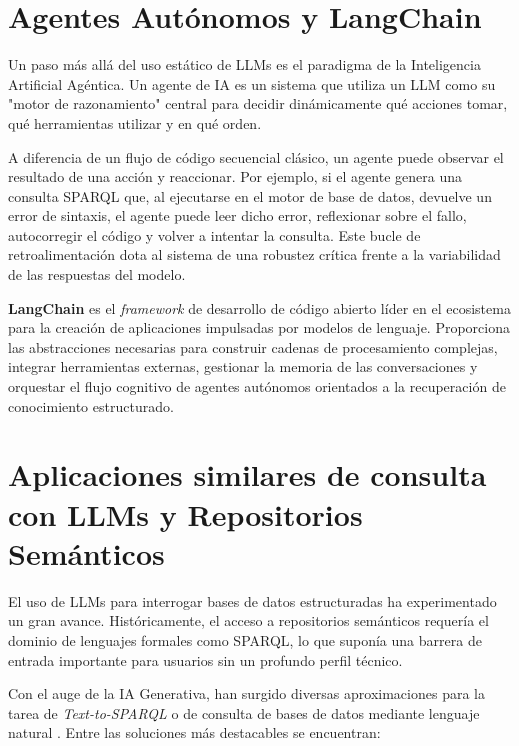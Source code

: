 \section{Agentes Autónomos y LangChain}

Un paso más allá del uso estático de LLMs es el paradigma de la Inteligencia Artificial Agéntica. Un agente de IA es un sistema que utiliza un LLM como su "motor de razonamiento" central para decidir dinámicamente qué acciones tomar, qué herramientas utilizar y en qué orden.

A diferencia de un flujo de código secuencial clásico, un agente puede observar el resultado de una acción y reaccionar. Por ejemplo, si el agente genera una consulta SPARQL que, al ejecutarse en el motor de base de datos, devuelve un error de sintaxis, el agente puede leer dicho error, reflexionar sobre el fallo, autocorregir el código y volver a intentar la consulta. Este bucle de retroalimentación dota al sistema de una robustez crítica frente a la variabilidad de las respuestas del modelo.

\textbf{LangChain} \cite{langchain} es el \textit{framework} de desarrollo de código abierto líder en el ecosistema para la creación de aplicaciones impulsadas por modelos de lenguaje. Proporciona las abstracciones necesarias para construir cadenas de procesamiento complejas, integrar herramientas externas, gestionar la memoria de las conversaciones y orquestar el flujo cognitivo de agentes autónomos orientados a la recuperación de conocimiento estructurado.

\section{Aplicaciones similares de consulta con LLMs y Repositorios Semánticos}

El uso de LLMs para interrogar bases de datos estructuradas ha experimentado un gran avance. Históricamente, el acceso a repositorios semánticos requería el dominio de lenguajes formales como SPARQL, lo que suponía una barrera de entrada importante para usuarios sin un profundo perfil técnico.

Con el auge de la IA Generativa, han surgido diversas aproximaciones para la tarea de \textit{Text-to-SPARQL} o de consulta de bases de datos mediante lenguaje natural \cite{yin2024text}. Entre las soluciones más destacables se encuentran:

